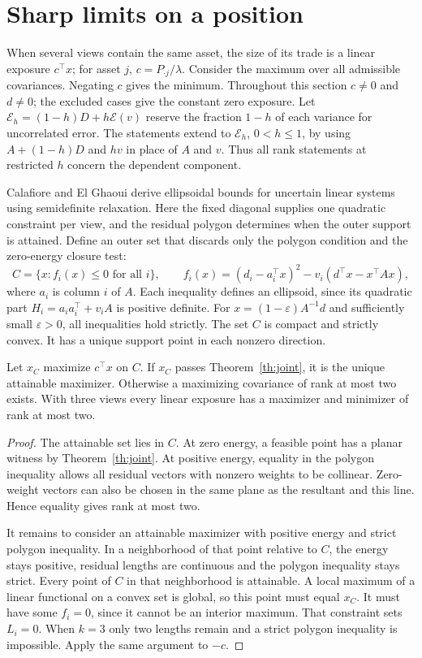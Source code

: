 \section{Sharp limits on a position}\label{sec:support}
When several views contain the same asset, the size of its trade is a linear exposure $c^\top x$; for asset $j$, $c=P_{\cdot j}/\lambda$. Consider the maximum over all admissible covariances. Negating $c$ gives the minimum. Throughout this section $c\ne0$ and $d\ne0$; the excluded cases give the constant zero exposure. Let $\mathcal E_h=(1-h)D+h\mathcal E(v)$ reserve the fraction $1-h$ of each variance for uncorrelated error. The statements extend to $\mathcal E_h$, $0<h\le1$, by using $A+(1-h)D$ and $hv$ in place of $A$ and $v$. Thus all rank statements at restricted $h$ concern the dependent component.

Calafiore and El Ghaoui \cite{uncertain} derive ellipsoidal bounds for uncertain linear systems using semidefinite relaxation. Here the fixed diagonal supplies one quadratic constraint per view, and the residual polygon determines when the outer support is attained. Define an outer set that discards only the polygon condition and the zero-energy closure test:
\[
 C=\{x:f_i(x)\le0\text{ for all }i\},\qquad
 f_i(x)=(d_i-a_i^\top x)^2-v_i(d^\top x-x^\top Ax),
\]
where $a_i$ is column $i$ of $A$. Each inequality defines an ellipsoid, since its quadratic part $H_i=a_i a_i^\top+v_i A$ is positive definite. For $x=(1-\varepsilon)A^{-1}d$ and sufficiently small $\varepsilon>0$, all inequalities hold strictly. The set $C$ is compact and strictly convex. It has a unique support point in each nonzero direction.

\begin{theorem}\label{th:support}
Let $x_C$ maximize $c^\top x$ on $C$. If $x_C$ passes Theorem~\ref{th:joint}, it is the unique attainable maximizer. Otherwise a maximizing covariance of rank at most two exists. With three views every linear exposure has a maximizer and minimizer of rank at most two.
\end{theorem}
\begin{proof}
The attainable set lies in $C$. At zero energy, a feasible point has a planar witness by Theorem~\ref{th:joint}. At positive energy, equality in the polygon inequality allows all residual vectors with nonzero weights to be collinear. Zero-weight vectors can also be chosen in the same plane as the resultant and this line. Hence equality gives rank at most two.

It remains to consider an attainable maximizer with positive energy and strict polygon inequality. In a neighborhood of that point relative to $C$, the energy stays positive, residual lengths are continuous and the polygon inequality stays strict. Every point of $C$ in that neighborhood is attainable. A local maximum of a linear functional on a convex set is global, so this point must equal $x_C$. It must have some $f_i=0$, since it cannot be an interior maximum. That constraint sets $L_i=0$. When $k=3$ only two lengths remain and a strict polygon inequality is impossible. Apply the same argument to $-c$.
\end{proof}

